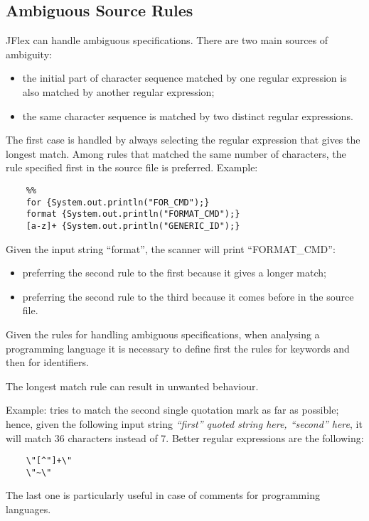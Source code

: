 \subsection{Ambiguous Source Rules}
JFlex can handle ambiguous specifications.
There are two main sources of ambiguity:
\begin{itemize}
	\item the initial part of character sequence matched by one regular expression is also matched by another regular expression;
	\item the same character sequence is matched by two distinct regular expressions.
\end{itemize}
The first case is handled by always selecting the regular expression that gives the longest match.
Among rules that matched the same number of characters, the rule specified first in the source file is preferred.
Example:
\begin{lstlisting}[frame=single]
	%%
	%%
	for {System.out.println("FOR_CMD");}
	format {System.out.println("FORMAT_CMD");}
	[a-z]+ {System.out.println("GENERIC_ID");}
\end{lstlisting}
Given the input string ``format'', the scanner will print ``FORMAT\_CMD'':
\begin{itemize}
	\item preferring the second rule to the first because it gives a longer match;
	\item preferring the second rule to the third because it comes before in the source file.
\end{itemize}

Given the rules for handling ambiguous specifications, when analysing a programming language it is necessary to define first the rules for keywords and then for identifiers.

The longest match rule can result in unwanted behaviour.

Example:  tries to match the second single quotation mark as far as possible; hence, given the following input string \emph{``first'' quoted string here, ``second'' here}, it will match 36 characters instead of 7.
Better regular expressions are the following:
\begin{lstlisting}
	\"[^"]+\"
	\"~\"
\end{lstlisting}
The last one is particularly useful in case of comments for programming languages.

